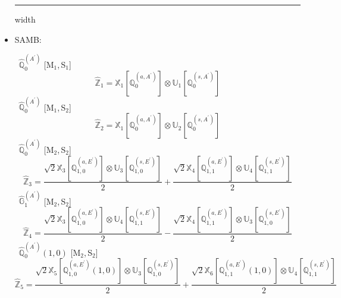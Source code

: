 \documentclass[fleqn,10pt,landscape]{article}
\begin{document}
\begin{itemize}
 \hfil \hrule height 1mm width \textwidth \hfil

\item SAMB:

\vspace{4mm}
\noindent {} $\,\,\,\hat{\mathbb{Q}}_{0}^{(A^{\prime})}$ [M$_{1}$,\,S$_{1}$]
\begin{dmath*}
\hat{\mathbb{Z}}_{1}=\mathbb{X}_{1}[\mathbb{Q}_{0}^{(a,A^{\prime})}] \otimes\mathbb{U}_{1}[\mathbb{Q}_{0}^{(s,A^{\prime})}]
\end{dmath*}
\vspace{4mm}
\noindent {} $\,\,\,\hat{\mathbb{Q}}_{0}^{(A^{\prime})}$ [M$_{1}$,\,S$_{2}$]
\begin{dmath*}
\hat{\mathbb{Z}}_{2}=\mathbb{X}_{1}[\mathbb{Q}_{0}^{(a,A^{\prime})}] \otimes\mathbb{U}_{2}[\mathbb{Q}_{0}^{(s,A^{\prime})}]
\end{dmath*}
\vspace{4mm}
\noindent {} $\,\,\,\hat{\mathbb{Q}}_{0}^{(A^{\prime})}$ [M$_{2}$,\,S$_{2}$]
\begin{dmath*}
\hat{\mathbb{Z}}_{3}=\frac{\sqrt{2} \mathbb{X}_{3}[\mathbb{Q}_{1,0}^{(a,E^{\prime})}] \otimes\mathbb{U}_{3}[\mathbb{Q}_{1,0}^{(s,E^{\prime})}]}{2} + \frac{\sqrt{2} \mathbb{X}_{4}[\mathbb{Q}_{1,1}^{(a,E^{\prime})}] \otimes\mathbb{U}_{4}[\mathbb{Q}_{1,1}^{(s,E^{\prime})}]}{2}
\end{dmath*}
\vspace{4mm}
\noindent {} $\,\,\,\hat{\mathbb{G}}_{1}^{(A^{\prime})}$ [M$_{2}$,\,S$_{2}$]
\begin{dmath*}
\hat{\mathbb{Z}}_{4}=\frac{\sqrt{2} \mathbb{X}_{3}[\mathbb{Q}_{1,0}^{(a,E^{\prime})}] \otimes\mathbb{U}_{4}[\mathbb{Q}_{1,1}^{(s,E^{\prime})}]}{2} - \frac{\sqrt{2} \mathbb{X}_{4}[\mathbb{Q}_{1,1}^{(a,E^{\prime})}] \otimes\mathbb{U}_{3}[\mathbb{Q}_{1,0}^{(s,E^{\prime})}]}{2}
\end{dmath*}
\vspace{4mm}
\noindent {} $\,\,\,\hat{\mathbb{Q}}_{0}^{(A^{\prime})}(1,0)$ [M$_{2}$,\,S$_{2}$]
\begin{dmath*}
\hat{\mathbb{Z}}_{5}=\frac{\sqrt{2} \mathbb{X}_{5}[\mathbb{Q}_{1,0}^{(a,E^{\prime})}(1,0)] \otimes\mathbb{U}_{3}[\mathbb{Q}_{1,0}^{(s,E^{\prime})}]}{2} + \frac{\sqrt{2} \mathbb{X}_{6}[\mathbb{Q}_{1,1}^{(a,E^{\prime})}(1,0)] \otimes\mathbb{U}_{4}[\mathbb{Q}_{1,1}^{(s,E^{\prime})}]}{2}

\end{dmath*}
\end{itemize}
\end{document}

